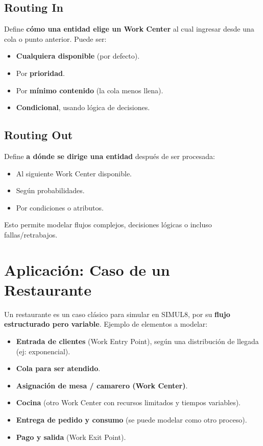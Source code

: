\documentclass[12pt]{article}
\begin{document}
\subsection*{Routing In}

Define \textbf{cómo una entidad elige un Work Center} al cual ingresar desde una cola o punto anterior. Puede ser:

\begin{itemize}
    \item \textbf{Cualquiera disponible} (por defecto).
    \item Por \textbf{prioridad}.
    \item Por \textbf{mínimo contenido} (la cola menos llena).
    \item \textbf{Condicional}, usando lógica de decisiones.
\end{itemize}

\subsection*{Routing Out}

Define \textbf{a dónde se dirige una entidad} después de ser procesada:

\begin{itemize}
    \item Al siguiente Work Center disponible.
    \item Según probabilidades.
    \item Por condiciones o atributos.
\end{itemize}

Esto permite modelar flujos complejos, decisiones lógicas o incluso fallas/retrabajos.

\section{Aplicación: Caso de un Restaurante}

Un restaurante es un caso clásico para simular en SIMUL8, por su \textbf{flujo estructurado pero variable}. Ejemplo de elementos a modelar:

\begin{itemize}
    \item \textbf{Entrada de clientes} (Work Entry Point), según una distribución de llegada (ej: exponencial).
    \item \textbf{Cola para ser atendido}.
    \item \textbf{Asignación de mesa / camarero (Work Center)}.
    \item \textbf{Cocina} (otro Work Center con recursos limitados y tiempos variables).
    \item \textbf{Entrega de pedido y consumo} (se puede modelar como otro proceso).
    \item \textbf{Pago y salida} (Work Exit Point).
\end{itemize}
\end{document}
